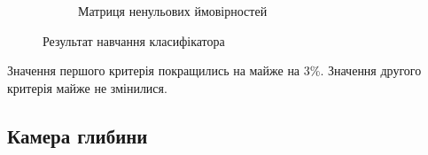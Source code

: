 \begin{figure}[H]
\begin{subfigure}[b]{0.45\textwidth}
		\caption{Матриця ненульових ймовірностей}
		\label{fig:b_start_gen}
	\end{subfigure}
	\caption{Результат навчання класифікатора}
	\label{fig:bayesian_representation_start}
\end{figure}

Значення першого критерія покращились на майже на 3\%. Значення другого критерія майже не змінилися.

\subsection{Камера глибини}
